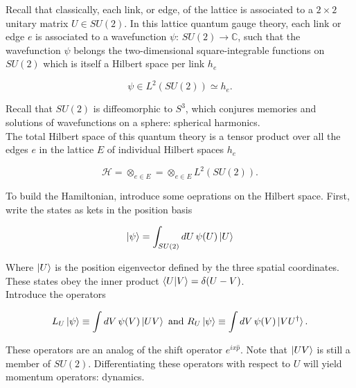 \noindent Recall that classically, each link, or edge, of the lattice is associated to a $2 \times2$ unitary matrix $U \in SU(2)$. In this lattice quantum gauge theory, each link or edge $e$ is associated to a wavefunction $\psi: \, SU(2) \rightarrow \mathbb{C}$, such that the wavefunction $\psi$ belongs the two-dimensional square-integrable functions on $SU(2)$ which is itself a Hilbert space per link $h_e$

\begin{equation}
\psi \in L^2 (SU(2)) \simeq h_e.
\end{equation}

\noindent Recall that $SU(2)$ is diffeomorphic to $S^3$, which conjures memories and solutions of wavefunctions on a sphere: spherical harmonics. \\

\noindent The total Hilbert space of this quantum theory is a tensor product over all the edges $e$ in the lattice $E$ of individual Hilbert spaces $h_e$

\begin{equation}
\mathcal{H} = \otimes_{e \in E} = \otimes_{e \in E} L^2 (SU(2)).
\end{equation}

\noindent To build the Hamiltonian, introduce some oeprations on the Hilbert space. First, write the states as kets in the position basis

\begin{equation}
\ket{\psi} = \int_{SU(2)} dU \, \psi (U) \ket{U}
\end{equation}

\noindent Where $\ket{U}$ is the position eigenvector defined by the three spatial coordinates. These states obey the inner product $\braket{U|V} = \delta(U-V)$. \\

\noindent Introduce the operators

\begin{equation}
L_U \ket{\psi} \equiv \int dV \, \psi (V) \ket{UV} \,\, \text{and} \,\, R_U \ket{\psi} \equiv \int dV \, \psi(V) \ket{VU^\dagger}.
\end{equation}

\noindent These operators are an analog of the shift operator $e^{ix \hat{p}}$. Note that $\ket{UV}$ is still a member of $SU(2)$. Differentiating these operators with respect to $U$ will yield momentum operators: dynamics.